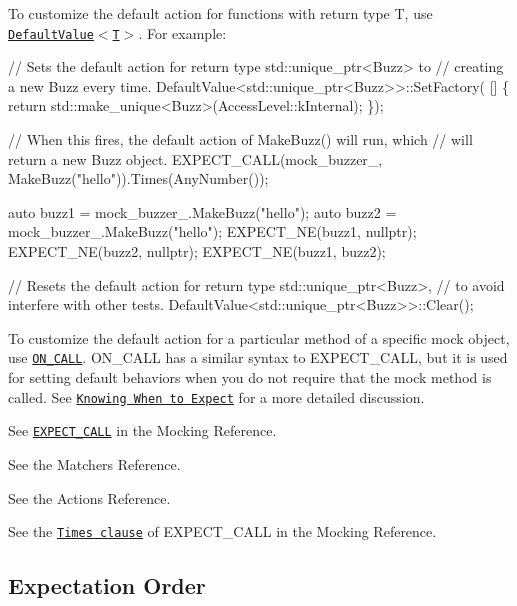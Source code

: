 To customize the default action for functions with return type {\ttfamily T}, use \href{reference/mocking.md#DefaultValue}{\tt {\ttfamily Default\+Value$<$T$>$}}. For example\+:


\begin{DoxyCode}
\textcolor{comment}{// Sets the default action for return type std::unique\_ptr<Buzz> to}
\textcolor{comment}{// creating a new Buzz every time.}
DefaultValue<std::unique\_ptr<Buzz>>::SetFactory(
    [] \{ \textcolor{keywordflow}{return} std::make\_unique<Buzz>(AccessLevel::kInternal); \});

\textcolor{comment}{// When this fires, the default action of MakeBuzz() will run, which}
\textcolor{comment}{// will return a new Buzz object.}
EXPECT\_CALL(mock\_buzzer\_, MakeBuzz(\textcolor{stringliteral}{"hello"})).Times(AnyNumber());

\textcolor{keyword}{auto} buzz1 = mock\_buzzer\_.MakeBuzz(\textcolor{stringliteral}{"hello"});
\textcolor{keyword}{auto} buzz2 = mock\_buzzer\_.MakeBuzz(\textcolor{stringliteral}{"hello"});
EXPECT\_NE(buzz1, \textcolor{keyword}{nullptr});
EXPECT\_NE(buzz2, \textcolor{keyword}{nullptr});
EXPECT\_NE(buzz1, buzz2);

\textcolor{comment}{// Resets the default action for return type std::unique\_ptr<Buzz>,}
\textcolor{comment}{// to avoid interfere with other tests.}
DefaultValue<std::unique\_ptr<Buzz>>::Clear();
\end{DoxyCode}


To customize the default action for a particular method of a specific mock object, use \href{reference/mocking.md#ON_CALL}{\tt {\ttfamily O\+N\+\_\+\+C\+A\+LL}}. {\ttfamily O\+N\+\_\+\+C\+A\+LL} has a similar syntax to {\ttfamily E\+X\+P\+E\+C\+T\+\_\+\+C\+A\+LL}, but it is used for setting default behaviors when you do not require that the mock method is called. See \href{gmock_cook_book.md#UseOnCall}{\tt Knowing When to Expect} for a more detailed discussion.

See \href{reference/mocking.md#EXPECT_CALL}{\tt {\ttfamily E\+X\+P\+E\+C\+T\+\_\+\+C\+A\+LL}} in the Mocking Reference.

See the Matchers Reference.

See the Actions Reference.

See the \href{reference/mocking.md#EXPECT_CALL.Times}{\tt {\ttfamily Times} clause} of {\ttfamily E\+X\+P\+E\+C\+T\+\_\+\+C\+A\+LL} in the Mocking Reference.

\subsection*{Expectation Order}

